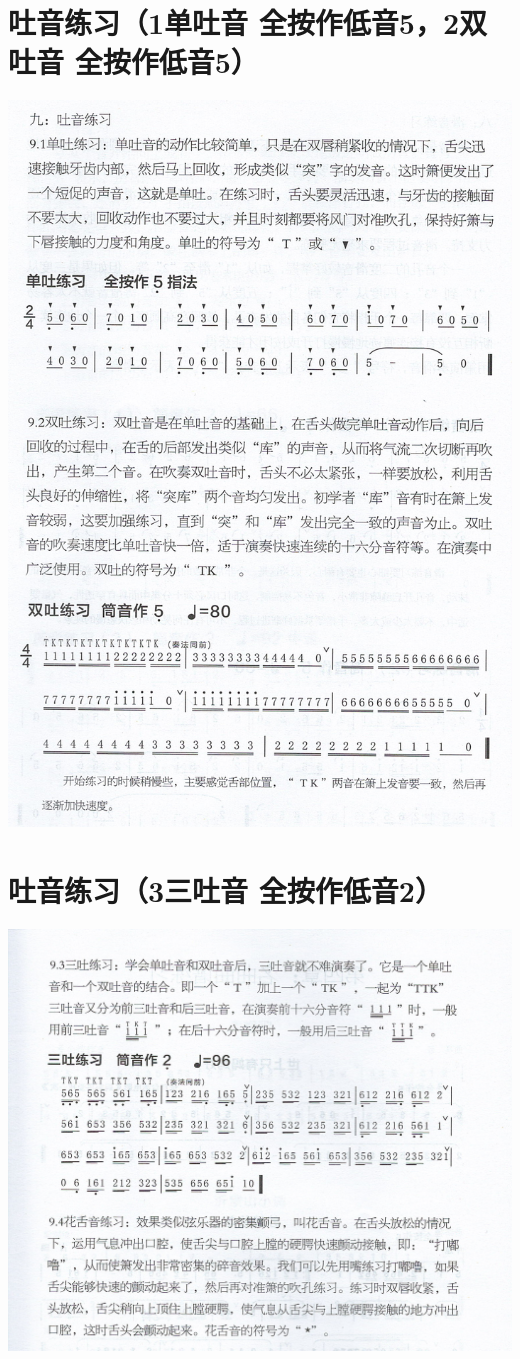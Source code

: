 \documentclass[cn,pad,chinese,chinesefont=nofont]{elegantbook}
\begin{document}
\section{吐音练习（1单吐音 全按作低音5，2双吐音 全按作低音5）}
\includegraphics[height=\textheight]{dongxiao/Scan 15.jpeg}
\section{吐音练习（3三吐音 全按作低音2）}
\includegraphics[width=\textwidth]{dongxiao/Scan 16-1.jpeg}
\end{document}
